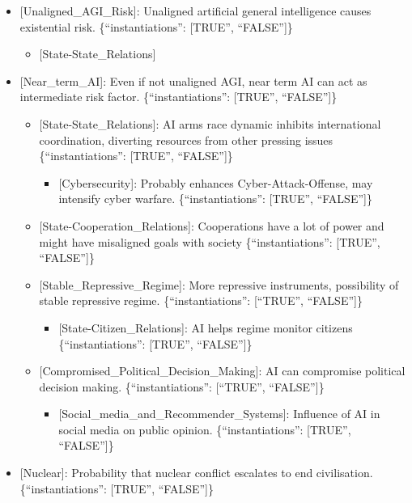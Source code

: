 \documentclass[
  11pt,
  letterpaper,
]{book}
\providecommand{\tightlist}{%
  \setlength{\itemsep}{0pt}\setlength{\parskip}{0pt}}
\begin{document}
\begin{itemize}
\tightlist
\item
  {[}Unaligned\_AGI\_Risk{]}: Unaligned artificial general intelligence
  causes existential risk. \{``instantiations'': {[}TRUE'',
  ``FALSE''{]}\}

  \begin{itemize}
  \tightlist
  \item
    {[}State-State\_Relations{]}
  \end{itemize}
\item
  {[}Near\_term\_AI{]}: Even if not unaligned AGI, near term AI can act
  as intermediate risk factor. \{``instantiations'': {[}TRUE'',
  ``FALSE''{]}\}

  \begin{itemize}
  \tightlist
  \item
    {[}State-State\_Relations{]}: AI arms race dynamic inhibits
    international coordination, diverting resources from other pressing
    issues \{``instantiations'': {[}TRUE'', ``FALSE''{]}\}

    \begin{itemize}
    \tightlist
    \item
      {[}Cybersecurity{]}: Probably enhances Cyber-Attack-Offense, may
      intensify cyber warfare. \{``instantiations'': {[}TRUE'',
      ``FALSE''{]}\}
    \end{itemize}
  \item
    {[}State-Cooperation\_Relations{]}: Cooperations have a lot of power
    and might have misaligned goals with society \{``instantiations'':
    {[}TRUE'', ``FALSE''{]}\}
  \item
    {[}Stable\_Repressive\_Regime{]}: More repressive instruments,
    possibility of stable repressive regime. \{``instantiations'':
    {[}``TRUE'', ``FALSE''{]}\}

    \begin{itemize}
    \tightlist
    \item
      {[}State-Citizen\_Relations{]}: AI helps regime monitor citizens
      \{``instantiations'': {[}TRUE'', ``FALSE''{]}\}
    \end{itemize}
  \item
    {[}Compromised\_Political\_Decision\_Making{]}: AI can compromise
    political decision making. \{``instantiations'': {[}``TRUE'',
    ``FALSE''{]}\}

    \begin{itemize}
    \tightlist
    \item
      {[}Social\_media\_and\_Recommender\_Systems{]}: Influence of AI in
      social media on public opinion. \{``instantiations'': {[}TRUE'',
      ``FALSE''{]}\}
    \end{itemize}
  \end{itemize}
\item
  {[}Nuclear{]}: Probability that nuclear conflict escalates to end
  civilisation. \{``instantiations'': {[}TRUE'', ``FALSE''{]}\}


\end{itemize}
\end{document}
